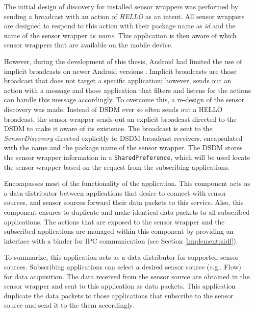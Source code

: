 \begin{description}[font=\normalfont\itshape]
    \item[Sensor Discovery] The initial design of discovery for installed sensor wrappers was performed by sending a broadcast with an action of \textit{HELLO} as an intent. All sensor wrappers are designed to respond to this action with their package name as \textit{id} and the name of the sensor wrapper as \textit{name}. This application is then aware of which sensor wrappers that are available on the mobile device. 
    
    However, during the development of this thesis, Android had limited the use of implicit broadcasts on newer Android versions \cite{broadcasterror}. Implicit broadcasts are those broadcast that does not target a specific application; however, sends out an action with a message and those application that filters and listens for the actions can handle this message accordingly. To overcome this, a re-design of the sensor discovery was made. Instead of DSDM ever so often sends out a HELLO broadcast, the sensor wrapper sends out an explicit broadcast directed to the DSDM to make it aware of its existence. The broadcast is sent to the \textit{SensorDiscovery} directed explicitly to DSDM broadcast receivers, encapsulated with the name and the package name of the sensor wrapper. The DSDM stores the sensor wrapper information in a \verb|SharedPreference|, which will be used locate the sensor wrapper based on the request from the subscribing applications.

    \item[DataStreamDispatchingService] Encompasses most of the functionality of the application. This component acts as a data distributor between applications that desire to connect with sensor sources, and sensor sources forward their data packets to this service. Also, this component ensures to duplicate and make identical data packets to all subscribed applications. The actions that are exposed to the sensor wrapper and the subscribed applications are managed within this component by providing an interface with a binder for IPC communication (see Section \ref{implement:aidl}). 

\end{description}


To summarize, this application acts as a data distributor for supported sensor sources. Subscribing applications can select a desired sensor source (e.g., Flow) for data acquisition. The data received from the sensor source are obtained in the sensor wrapper and sent to this application as data packets. This application duplicate the data packets to those applications that subscribe to the sensor source and send it to the them accordingly. 


